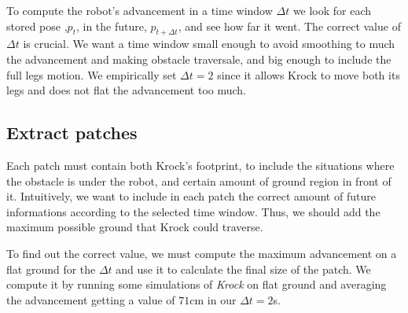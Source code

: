 \documentclass[../document.tex]{subfiles}
\begin{document}
To compute the robot's advancement in a time window $\Delta t$ we look for each stored pose ,$p_t$, in the future, $p_{t + \Delta t}$, and see how far it went. 
The correct value of $\Delta t$ is crucial. We want a time window small enough to avoid smoothing to much the advancement and making obstacle traversale, and big enough to include the full legs motion. We empirically set $\Delta t = 2$ since it allows Krock to move both its legs and does not flat the advancement too much. 
\subsection{Extract patches}
Each patch must contain both Krock's footprint, to include the situations where the obstacle is under the robot, and certain amount of ground region in front of it. Intuitively, we want to include in each patch the correct amount of future informations according to the selected time window. Thus, we should add the maximum possible ground that Krock could traverse. 

To find out the correct value, we must compute the maximum advancement on a flat ground for the $\Delta t$ and use it to calculate the final size of the patch. We compute it by running some simulations of \emph{Krock} on flat ground and averaging the advancement getting a value of $71$cm in our $\Delta t = 2$s.
\end{document}
